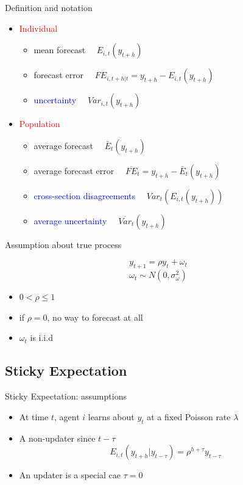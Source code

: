 \documentclass{beamer}
\begin{document}
\begin{frame}{Definition and notation}
\begin{itemize}
	\item \textcolor{red}{Individual}
	\begin{itemize}
		\item  mean forecast $\quad E_{i,t}(y_{t+h})$
		\item forecast error $\quad FE_{i,t+h|t} = y_{t+h}- E_{i,t}(y_{t+h})$
		\item \textcolor{blue}{uncertainty} $\quad Var_{i,t}(y_{t+h})$
	\end{itemize}
	\item \textcolor{red}{Population}
	\begin{itemize}
		\item average forecast  $\quad \bar E_{t}(y_{t+h})$
		\item average forecast error $\quad \overline {FE}_{t}= y_{t+h}-\bar E_{t}(y_{t+h})$
		\item \textcolor{blue}{cross-section disagreements}  $\quad Var_t(E_{i,t}(y_{t+h}))$
		\item \textcolor{blue}{average uncertainty}  $\quad \overline{Var}_t(y_{t+h})$
	\end{itemize}
\end{itemize}

\end{frame}


\begin{frame}{Assumption about true process}

$$y_{t+1} = \rho y_t + \omega_t  $$ 
$$\omega_t \sim N(0,\sigma^2_{\omega})$$

\begin{itemize}
	\item $0 < \rho \leq 1$
	\item if $\rho =0$, no way to forecast at all
	\item $\omega_t$ is i.i.d 
\end{itemize}

\end{frame}


\subsection{Sticky Expectation}


\begin{frame}{Sticky Expectation: assumptions}
\begin{itemize}
	\item At time $t$, agent $i$ learns about $y_t$ at a fixed Poisson rate $\lambda$ 
	\item A non-updater since $t-\tau$  
	$$E_{i,t}(y_{t+h}|y_{t-\tau}) =\rho^{h+\tau} y_{t-\tau} $$
	\item An updater is a special cae  $\tau=0$ 
\end{itemize}
\end{frame}
\end{document}
